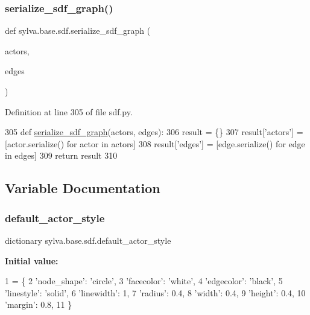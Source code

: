 \subsubsection{\texorpdfstring{serialize\+\_\+sdf\+\_\+graph()}{serialize\_sdf\_graph()}}
{\footnotesize\ttfamily def sylva.\+base.\+sdf.\+serialize\+\_\+sdf\+\_\+graph (\begin{DoxyParamCaption}\item[{}]{actors,  }\item[{}]{edges }\end{DoxyParamCaption})}



Definition at line 305 of file sdf.\+py.


\begin{DoxyCode}
305     \textcolor{keyword}{def }\hyperlink{namespacesylva_1_1base_1_1sdf_af3757c4b0997b952e06efde4a2da8321}{serialize\_sdf\_graph}(actors, edges):
306         result = \{\}
307         result[\textcolor{stringliteral}{'actors'}] = [actor.serialize() \textcolor{keywordflow}{for} actor \textcolor{keywordflow}{in} actors]
308         result[\textcolor{stringliteral}{'edges'}] = [edge.serialize() \textcolor{keywordflow}{for} edge \textcolor{keywordflow}{in} edges]
309         \textcolor{keywordflow}{return} result
310 
\end{DoxyCode}


\subsection{Variable Documentation}
\mbox{\label{namespacesylva_1_1base_1_1sdf_a39d9eb96b3c8367d46f62630c694532a}} 
\subsubsection{\texorpdfstring{default\+\_\+actor\+\_\+style}{default\_actor\_style}}
{\footnotesize\ttfamily dictionary sylva.\+base.\+sdf.\+default\+\_\+actor\+\_\+style}

{\bfseries Initial value\+:}
\begin{DoxyCode}
1 =  \{
2         \textcolor{stringliteral}{'node\_shape'}: \textcolor{stringliteral}{'circle'},
3         \textcolor{stringliteral}{'facecolor'}: \textcolor{stringliteral}{'white'},
4         \textcolor{stringliteral}{'edgecolor'}: \textcolor{stringliteral}{'black'},
5         \textcolor{stringliteral}{'linestyle'}: \textcolor{stringliteral}{'solid'},
6         \textcolor{stringliteral}{'linewidth'}: 1,
7         \textcolor{stringliteral}{'radius'}: 0.4,
8         \textcolor{stringliteral}{'width'}: 0.4,
9         \textcolor{stringliteral}{'height'}: 0.4,
10         \textcolor{stringliteral}{'margin'}: 0.8,
11     \}
\end{DoxyCode}


